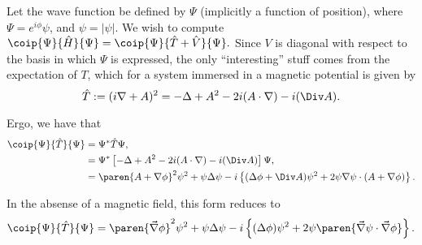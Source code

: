 \documentclass[onecolumn,,amsmath,amssymb,nofootinbib,floatfix]{revtex4}
\begin{document}
Let the wave function be defined by $\Psi$ (implicitly a function of position), where $\Psi=e^{i\phi} \psi$, and $\psi=|\psi|$.  We wish to compute $\coip{\Psi}{\hat H}{\Psi} = \coip{\Psi}{\hat T+\hat V}{\Psi}.$  Since $V$ is diagonal with respect to the basis in which $\Psi$ is expressed, the only ``interesting'' stuff comes from the expectation of $T$, which for a system immersed in a magnetic potential is given by $$\hat T:=(i\nabla + A)^2 = -\Delta + A^2 - 2i(A\cdot \nabla) - i(\Div A).$$

Ergo, we have that
$$
\begin{aligned}
\coip{\Psi}{\hat T}{\Psi}
&= \Psi^* \hat T \Psi, \\
&= \Psi^* \left[-\Delta + A^2 - 2i(A\cdot \nabla) - i(\Div A)\right] \Psi, \\
&= \paren{A+\nabla \phi}^2\psi^2 + \psi\Delta \psi - i\left\{(\Delta \phi + \Div A)\psi^2 + 2\psi\nabla\psi \cdot (A+\nabla\phi)\right\}.
\end{aligned}
$$

In the absense of a magnetic field, this form reduces to
$$\coip{\Psi}{\hat T}{\Psi}= \paren{\vec\nabla \phi}^2\psi^2 + \psi\Delta \psi - i\left\{(\Delta \phi)\psi^2 + 2\psi\paren{\vec{\nabla}\psi \cdot \vec{\nabla}\phi}\right\}.$$
\end{document}
